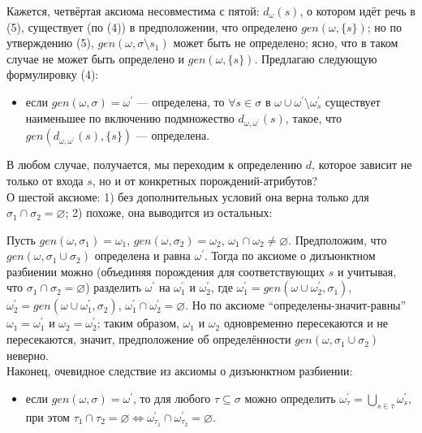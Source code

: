 





\hrulefill

Кажется, четвёртая аксиома несовместима с пятой: $d_\omega(s)$, о котором идёт речь в (5), существует (по (4)) в предположении, что определено $gen(\omega, \{s\})$; но по утверждению (5), $gen(\omega, \sigma\setminus s_1)$ может быть не определено; ясно, что в таком случае не может быть определено и $gen(\omega, \{s\})$. Предлагаю следующую формулировку (4):

\begin{itemize}
	\item если $gen(\omega,\sigma)=\omega^\prime$ --- определена, то $\forall s \in \sigma$ в $\omega \cup \omega^\prime \setminus \omega^\prime_s$ существует наименьшее по включению подмножество $d_{\omega,\omega^\prime}(s)$, такое, что $gen(d_{\omega,\omega^\prime}(s), \{s\})$ --- определена.
\end{itemize}

В любом случае, получается, мы переходим к определению $d$, которое зависит не только от входа $s$, но и от конкретных порождений-атрибутов?
\\

О шестой аксиоме: 1) без дополнительных условий она верна только для $\sigma_1\cap\sigma_2 = \varnothing$; 2) похоже, она выводится из остальных:

Пусть $gen(\omega,\sigma_1) = \omega_1$, $gen(\omega,\sigma_2) = \omega_2$, $\omega_1\cap\omega_2\ne\varnothing$. Предположим, что $gen(\omega,\sigma_1\cup\sigma_2)$ определена и равна $\omega^\prime$. Тогда по аксиоме о дизъюнктном разбиении можно (объединяя порождения для соответствующих $s$ и учитывая, что $\sigma_1\cap\sigma_2 = \varnothing$) разделить $\omega^\prime$ на $\omega^\prime_1$ и $\omega^\prime_2$, где $\omega^\prime_1 = gen(\omega\cup\omega^\prime_2,\sigma_1)$, $\omega^\prime_2 = gen(\omega\cup\omega^\prime_1,\sigma_2)$, $\omega^\prime_1 \cap \omega^\prime_2 = \varnothing$. Но по аксиоме ``определены-значит-равны'' $\omega_1 = \omega^\prime_1$ и $\omega_2 = \omega^\prime_2$; таким образом, $\omega_1$ и $\omega_2$ одновременно пересекаются и не пересекаются, значит, предположение об определённости $gen(\omega,\sigma_1\cup\sigma_2)$ неверно.
\\

Наконец, очевидное следствие из аксиомы о дизъюнктном разбиении:

\begin{itemize}
	\item если $gen(\omega,\sigma)=\omega^\prime$, то для любого $\tau \subseteq \sigma$ можно определить $\omega^\prime_\tau =\bigcup\limits_{s\in\tau}\omega^\prime_s$, при этом $\tau_1 \cap \tau_2 = \varnothing \Leftrightarrow \omega^\prime_{\tau_1} \cap \omega^\prime_{\tau_2} = \varnothing$.
\end{itemize}

